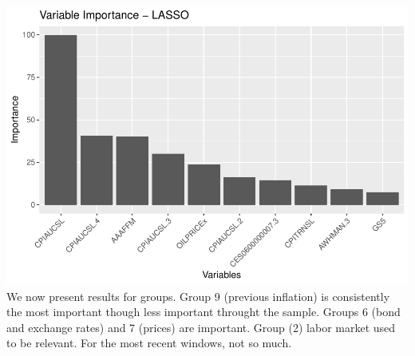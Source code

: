 \documentclass[
]{article}
\begin{document}
\includegraphics{Trabalho_Econo4_Q2_files/figure-latex/unnamed-chunk-32-1.pdf}
We now present results for groups. Group 9 (previous inflation) is
consistently the most important though less important throught the
sample. Groups 6 (bond and exchange rates) and 7 (prices) are important.
Group (2) labor market used to be relevant. For the most recent windows,
not so much.
\end{document}
